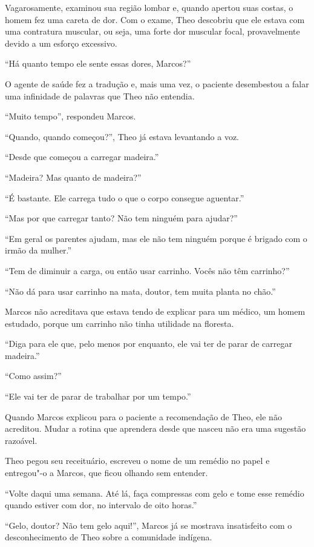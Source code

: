 Vagarosamente, examinou sua região lombar e, quando apertou suas costas,
o homem fez uma careta de dor. Com o exame, Theo descobriu que ele
estava com uma contratura muscular, ou seja, uma forte dor muscular
focal, provavelmente devido a um esforço excessivo.

``Há quanto tempo ele sente essas dores, Marcos?''

O agente de saúde fez a tradução e, mais uma vez, o paciente desembestou a falar
uma infinidade de palavras que Theo não entendia.

``Muito tempo'', respondeu Marcos.

``Quando, quando começou?'', Theo já estava levantando a voz.

``Desde que começou a carregar madeira.''

``Madeira? Mas quanto de madeira?''

``É bastante. Ele carrega tudo o que o corpo consegue aguentar.''

``Mas por que carregar tanto? Não tem ninguém para ajudar?''

``Em geral os parentes ajudam, mas ele não tem ninguém porque é brigado
com o irmão da mulher.''

``Tem de diminuir a carga, ou então usar carrinho. Vocês não têm
carrinho?''

``Não dá para usar carrinho na mata, doutor, tem muita planta no chão.''

Marcos não acreditava que estava tendo de explicar para um médico, um
homem estudado, porque um carrinho não tinha utilidade na floresta.

``Diga para ele que, pelo menos por enquanto, ele vai ter de parar de
carregar madeira.''

``Como assim?''

``Ele vai ter de parar de trabalhar por um tempo.''

Quando Marcos explicou para o paciente a recomendação de Theo, ele não
acreditou. Mudar a rotina que aprendera desde que nasceu não era uma
sugestão razoável.

Theo pegou seu receituário, escreveu o nome de um remédio no papel e
entregou"-o a Marcos, que ficou olhando sem entender.

``Volte daqui uma semana. Até lá, faça compressas com gelo e tome esse
remédio quando estiver com dor, no intervalo de oito horas.''

``Gelo, doutor? Não tem gelo aqui!'', Marcos já se mostrava insatisfeito
com o desconhecimento de Theo sobre a comunidade indígena.

